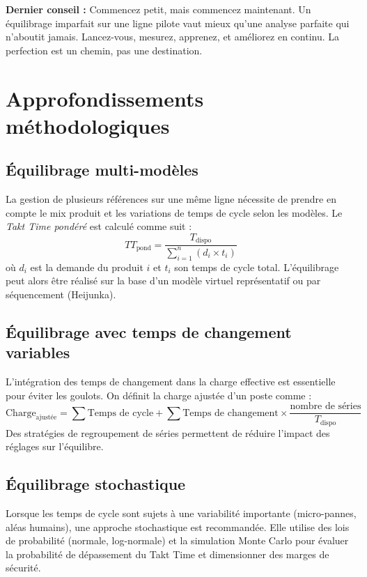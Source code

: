 \documentclass[12pt,a4paper]{article}
\newenvironment{importantnote}
  {\begin{tcolorbox}[colback=blue!5!white, colframe=blue!50!black, title=\textbf{Point Important}]\small}
  {\end{tcolorbox}}
\begin{document}
\begin{center}
\begin{importantnote}
\textbf{Dernier conseil :} Commencez petit, mais commencez maintenant. Un équilibrage imparfait sur une ligne pilote vaut mieux qu'une analyse parfaite qui n'aboutit jamais. Lancez-vous, mesurez, apprenez, et améliorez en continu. La perfection est un chemin, pas une destination.
\end{importantnote}

\section{Approfondissements méthodologiques}

\subsection{Équilibrage multi-modèles}
La gestion de plusieurs références sur une même ligne nécessite de prendre en compte le mix produit et les variations de temps de cycle selon les modèles. Le \textit{Takt Time pondéré} est calculé comme suit :
\[
TT_{\text{pond}} = \frac{T_{\text{dispo}}}{\sum_{i=1}^{n} (d_i \times t_i)}
\]
où \(d_i\) est la demande du produit \(i\) et \(t_i\) son temps de cycle total. L'équilibrage peut alors être réalisé sur la base d'un modèle virtuel représentatif ou par séquencement (Heijunka).

\subsection{Équilibrage avec temps de changement variables}
L'intégration des temps de changement dans la charge effective est essentielle pour éviter les goulots. On définit la charge ajustée d'un poste comme :
\[
\text{Charge}_{\text{ajustée}} = \sum \text{Temps de cycle} + \sum \text{Temps de changement} \times \frac{\text{nombre de séries}}{T_{\text{dispo}}}
\]
Des stratégies de regroupement de séries permettent de réduire l'impact des réglages sur l'équilibre.

\subsection{Équilibrage stochastique}
Lorsque les temps de cycle sont sujets à une variabilité importante (micro-pannes, aléas humains), une approche stochastique est recommandée. Elle utilise des lois de probabilité (normale, log-normale) et la simulation Monte Carlo pour évaluer la probabilité de dépassement du Takt Time et dimensionner des marges de sécurité.


\end{center}
\end{document}
